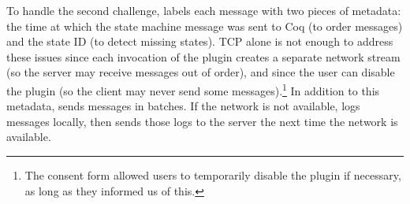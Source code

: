 To handle the second challenge, \toolname{} labels each message
with two pieces of metadata: the time at which the state machine message was sent to Coq (to order messages)
and the state ID (to detect missing states).
TCP alone is not enough to address these issues since each invocation
of the plugin creates a separate network stream
(so the server may receive messages out of order),
and since the user can disable the plugin
(so the client may never send some 
messages).\footnote{The consent form allowed users to temporarily disable
the plugin if necessary, as long as they informed us of this.} 
In addition to this metadata,
\toolname{} sends messages in batches.
If the network is not available, \toolname{} logs messages locally,
then sends those logs to the server the next time
the network is available.
